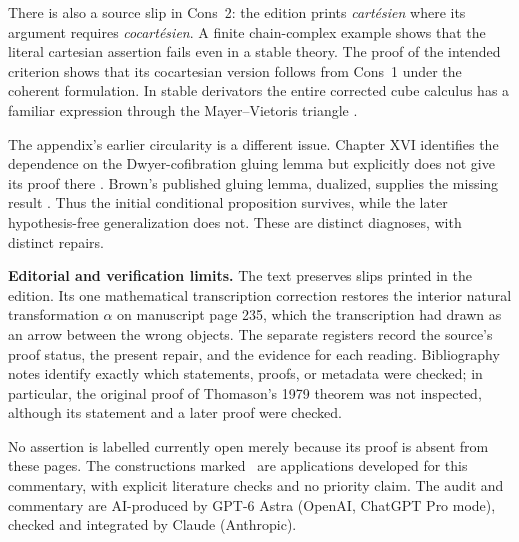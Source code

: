 There is also a source slip in Cons~2: the edition prints \emph{cart\'esien} where its argument requires \emph{cocart\'esien}. A finite chain-complex example shows that the literal cartesian assertion fails even in a stable theory. The proof of the intended criterion shows that its cocartesian version follows from Cons~1 under the coherent formulation. In stable derivators the entire corrected cube calculus has a familiar expression through the Mayer--Vietoris triangle \citep[Theorems~6.1 and 7.1, arXiv v2]{GrothPontoShulman2014}.

The appendix's earlier circularity is a different issue. Chapter XVI identifies the dependence on the Dwyer-cofibration gluing lemma but explicitly does not give its proof there \citep[\S3, ms.~pp.~18--23]{GrothendieckDerivateursXVI}. Brown's published gluing lemma, dualized, supplies the missing result \citep[Part~I, \S4, Lemma~2]{Brown1973}. Thus the initial conditional proposition survives, while the later hypothesis-free generalization does not. These are distinct diagnoses, with distinct repairs.

\medskip\noindent\textbf{Editorial and verification limits.}
The text preserves slips printed in the edition. Its one mathematical transcription correction restores the interior natural transformation $\alpha$ on manuscript page 235, which the transcription had drawn as an arrow between the wrong objects. The separate registers record the source's proof status, the present repair, and the evidence for each reading. Bibliography notes identify exactly which statements, proofs, or metadata were checked; in particular, the original proof of Thomason's 1979 theorem was not inspected, although its statement and a later proof were checked.

No assertion is labelled currently open merely because its proof is absent from these pages. The constructions marked \ours\ are applications developed for this commentary, with explicit literature checks and no priority claim. The audit and commentary are AI-produced by GPT-6 Astra (OpenAI, ChatGPT Pro mode), checked and integrated by Claude (Anthropic).
\endgroup
